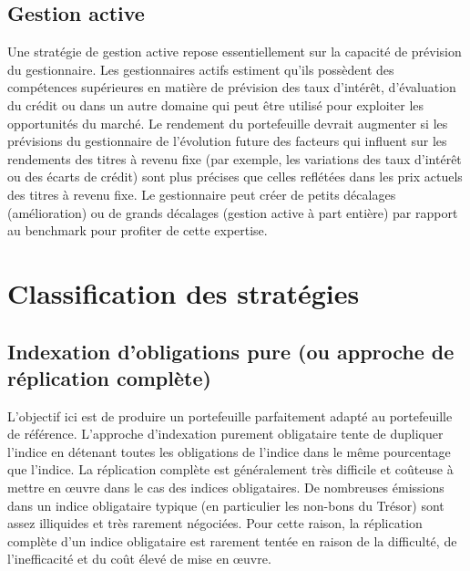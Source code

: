 \documentclass[12pt]{article}
\begin{document}
\subsection{Gestion active}
Une stratégie de gestion active repose essentiellement sur la capacité de prévision du gestionnaire. Les gestionnaires actifs estiment qu'ils possèdent des compétences supérieures en matière de prévision des taux d'intérêt, d'évaluation du crédit ou dans un autre domaine qui peut être utilisé pour exploiter les opportunités du marché. Le rendement du portefeuille devrait augmenter si les prévisions du gestionnaire de l’évolution future des facteurs qui influent sur les rendements des titres à revenu fixe (par exemple, les variations des taux d’intérêt ou des écarts de crédit) sont plus précises que celles reflétées dans les prix actuels des titres à revenu fixe.  Le gestionnaire peut créer de petits décalages (amélioration) ou de grands décalages (gestion active à part entière) par rapport au benchmark pour profiter de cette expertise.

\section{Classification des stratégies}

\subsection{Indexation d'obligations pure (ou approche de réplication complète)}
L'objectif ici est de produire un portefeuille parfaitement adapté au portefeuille de référence. L'approche d'indexation purement obligataire tente de dupliquer l'indice en détenant toutes les obligations de l'indice dans le même pourcentage que l'indice. La réplication complète est généralement très difficile et coûteuse à mettre en œuvre dans le cas des indices obligataires. De nombreuses émissions dans un indice obligataire typique (en particulier les non-bons du Trésor) sont assez illiquides et très rarement négociées. Pour cette raison, la réplication complète d'un indice obligataire est rarement tentée en raison de la difficulté, de l'inefficacité et du coût élevé de mise en œuvre.
\end{document}
